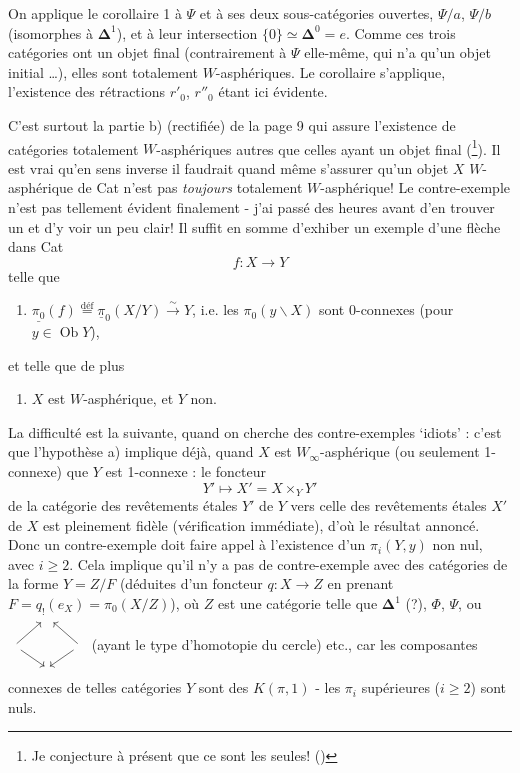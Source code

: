 \documentclass[11pt]{article}
\newcommand{\printedpage}[1]{\marginpar{\footnotesize p.~#1}}
\newcommand{\msp}[1]{\marginpar{\footnotesize [#1]}}
\newcommand{\upi}{\underline{\pi}}
\newcommand{\Ob}{\operatorname{Ob}}
\newcommand{\bDelta}{\boldsymbol{\Delta}}
\begin{document}
On applique le corollaire 1 à $\Psi$ et à ses deux sous-catégories ouvertes, $\Psi/a$, $\Psi/b$ (isomorphes à $\bDelta^1$), et à leur intersection $\{0\} \simeq \bDelta^0 = e$. Comme ces trois catégories ont un objet final (contrairement à $\Psi$ elle-même, qui n'a qu'un objet initial \dots), elles sont totalement $W$-asphériques. Le corollaire s'applique, l'existence des rétractions $r'_0$, $r''_0$ étant ici évidente.

C'est surtout la partie b) (rectifiée) de la page 9 qui assure l'existence de catégories totalement $W$-asphériques autres que celles ayant un objet final (\footnote{Je conjecture à présent que ce sont les seules! (\footnotemark)}). Il est vrai qu'en sens inverse il faudrait quand même s'assurer qu'un objet $X$ $W$-asphérique de Cat n'est pas \textit{toujours} totalement $W$-asphérique! Le contre-exemple n'est pas tellement évident finalement -
\msp{page 101}
j'ai passé des heures avant d'en trouver un et d'y voir un peu clair! Il suffit en somme d'exhiber un exemple d'une flèche dans Cat
\[
f : X \longrightarrow Y
\]
telle que
\printedpage{71}
\begin{enumerate}[label=\alph*)]
\item $\underline{\pi_0}(f) \overset{\text{déf}}{=} \upi_0(X/Y) \xrightarrow{\ \sim\ } Y$, i.e. les $\pi_0(y\backslash X)$ sont 0-connexes (pour $y \in \Ob Y$),
\end{enumerate}

et telle que de plus

\begin{enumerate}[label=\alph*), start=2]
\item $X$ est $W$-asphérique, et $Y$ non.
\end{enumerate}

La difficulté est la suivante, quand on cherche des contre-exemples `idiots' : c'est que l'hypothèse a) implique déjà, quand $X$ est $W_\infty$-asphérique (ou seulement 1-connexe) que $Y$ est 1-connexe : le foncteur
\[
Y' \longmapsto X' = X \times_Y Y'
\]
de la catégorie des revêtements étales $Y'$ de $Y$ vers celle des revêtements étales $X'$ de $X$ est pleinement fidèle (vérification immédiate), d'où le résultat annoncé. Donc un contre-exemple doit faire appel à l'existence d'un $\pi_i(Y,y)$ non nul, avec $i \geq 2$. Cela implique
\msp{page 102}
qu'il n'y a pas de contre-exemple avec des catégories de la forme $Y = Z/F$ (déduites d'un foncteur $q : X \longrightarrow Z$ en prenant $F = q_!(e_X) = \pi_0(X/Z)$), où $Z$ est une catégorie telle que $\bDelta^1$ (?), $\Phi$, $\Psi$, ou $\begin{tikzcd}[ampersand replacement=\&, sep=small, baseline=(M.base)]
 \& {} \& \\
{} \arrow[ur] \arrow[dr] \& |[alias=M]| \phantom{x} \& {} \arrow[ul] \arrow[dl] \\
 \& {} \&
\end{tikzcd}$ (ayant le type d'homotopie du cercle) etc., car les composantes connexes de telles catégories $Y$ sont des $K(\pi,1)$ - les $\pi_i$ supérieures ($i \geq 2$) sont nuls.
\end{document}
